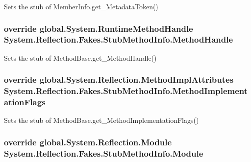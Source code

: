 Sets the stub of Member\-Info.\-get\-\_\-\-Metadata\-Token()

\hypertarget{class_system_1_1_reflection_1_1_fakes_1_1_stub_method_info_a44927485a2a1ccfc591f2150dda6a1f8}{
\subsubsection[{Method\-Handle}]{\setlength{\rightskip}{0pt plus 5cm}override global.\-System.\-Runtime\-Method\-Handle System.\-Reflection.\-Fakes.\-Stub\-Method\-Info.\-Method\-Handle\hspace{0.3cm}{\ttfamily [get]}}}\label{class_system_1_1_reflection_1_1_fakes_1_1_stub_method_info_a44927485a2a1ccfc591f2150dda6a1f8}


Sets the stub of Method\-Base.\-get\-\_\-\-Method\-Handle()

\hypertarget{class_system_1_1_reflection_1_1_fakes_1_1_stub_method_info_a43a792daad7d83d704dfd5ac9e250996}{
\subsubsection[{Method\-Implementation\-Flags}]{\setlength{\rightskip}{0pt plus 5cm}override global.\-System.\-Reflection.\-Method\-Impl\-Attributes System.\-Reflection.\-Fakes.\-Stub\-Method\-Info.\-Method\-Implementation\-Flags\hspace{0.3cm}{\ttfamily [get]}}}\label{class_system_1_1_reflection_1_1_fakes_1_1_stub_method_info_a43a792daad7d83d704dfd5ac9e250996}


Sets the stub of Method\-Base.\-get\-\_\-\-Method\-Implementation\-Flags()

\hypertarget{class_system_1_1_reflection_1_1_fakes_1_1_stub_method_info_afe0405f2271a480d02edb0f29d133ae5}{
\subsubsection[{Module}]{\setlength{\rightskip}{0pt plus 5cm}override global.\-System.\-Reflection.\-Module System.\-Reflection.\-Fakes.\-Stub\-Method\-Info.\-Module\hspace{0.3cm}{\ttfamily [get]}}}\label{class_system_1_1_reflection_1_1_fakes_1_1_stub_method_info_afe0405f2271a480d02edb0f29d133ae5}


